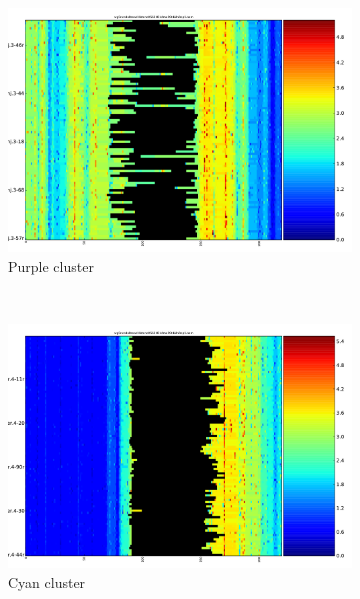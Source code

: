 \documentclass[parskip]{cs4rep}
\begin{document}
\begin{figure}[t,b]
    \centering
    \begin{subfigure}[b]{0.22\textwidth}
        \includegraphics[width=\textwidth]{figures/evaluation/exon_stretching/cluster-warped-2.pdf}
        \caption{Purple cluster}
        \label{fig:evaluation:exon_stretching:clusters:1:warped}
    \end{subfigure}
    ~
    \begin{subfigure}[b]{0.22\textwidth}
        \includegraphics[width=\textwidth]{figures/evaluation/exon_stretching/cluster-warped-1.pdf}
        \caption{Cyan cluster}
        \label{fig:evaluation:exon_stretching:clusters:2:warped}
    \end{subfigure}
    ~
    \begin{subfigure}[b]{0.22\textwidth}

\end{subfigure}
\end{figure}
\end{document}
